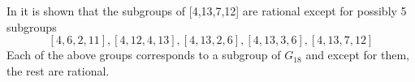 \documentclass{article}
\theoremstyle{plain}
\theoremstyle{definition}
\begin{document}
In \cite{Nicole1} it is shown that the subgroups of [4,13,7,12] are rational except for possibly 5 subgroups $$[4, 6, 2, 11], [4, 12, 4, 13], [4, 13, 2, 6], [4, 13, 3, 6], [4, 13, 7, 12]$$
Each of the above groups corresponds to a subgroup of $G_{18}$ and except for them, the rest are rational.
%
%
%
\end{document}
